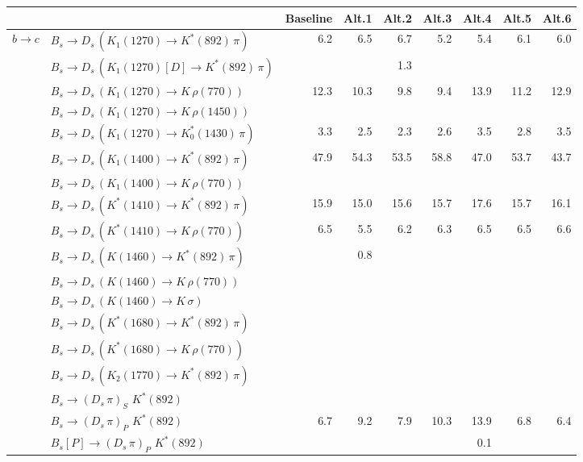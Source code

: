 \begin{tabular}{l l  r  r  r  r  r  r  r  } 
\toprule
& & \multicolumn{1}{c}{Baseline}  & \multicolumn{1}{c}{Alt.1}  & \multicolumn{1}{c}{Alt.2}  & \multicolumn{1}{c}{Alt.3}  & \multicolumn{1}{c}{Alt.4}  & \multicolumn{1}{c}{Alt.5}  & \multicolumn{1}{c}{Alt.6}  \\ 
\hline
\multirow{30}{*}{$b \to c$}  & $B_s \to D_s \, ( K_1(1270) \to K^{*}(892) \, \pi )$ & 6.2 & 6.5 & 6.7 & 5.2 & 5.4 & 6.1 & 6.0 \\ 
 & $B_s \to D_s \, ( K_1(1270)[D] \to K^{*}(892) \, \pi )$ &  &  & 1.3 &  &  &  &  \\ 
 & $B_s \to D_s \, ( K_1(1270) \to K \, \rho(770) )$ & 12.3 & 10.3 & 9.8 & 9.4 & 13.9 & 11.2 & 12.9 \\ 
 & $B_s \to D_s \, ( K_1(1270) \to K \, \rho(1450) )$ &  &  &  &  &  &  &  \\ 
 & $B_s \to D_s \, ( K_1(1270) \to K^{*}_{0}(1430) \, \pi )$ & 3.3 & 2.5 & 2.3 & 2.6 & 3.5 & 2.8 & 3.5 \\ 
 & $B_s \to D_s \, ( K_1(1400) \to K^{*}(892) \, \pi )$ & 47.9 & 54.3 & 53.5 & 58.8 & 47.0 & 53.7 & 43.7 \\ 
 & $B_s \to D_s \, ( K_1(1400) \to K \, \rho(770) )$ &  &  &  &  &  &  &  \\ 
 & $B_s \to D_s \, ( K^{*}(1410) \to K^{*}(892) \, \pi )$ & 15.9 & 15.0 & 15.6 & 15.7 & 17.6 & 15.7 & 16.1 \\ 
 & $B_s \to D_s \, ( K^{*}(1410) \to K \, \rho(770) )$ & 6.5 & 5.5 & 6.2 & 6.3 & 6.5 & 6.5 & 6.6 \\ 
 & $B_s \to D_s \, ( K(1460) \to K^{*}(892) \, \pi )$ &  & 0.8 &  &  &  &  &  \\ 
 & $B_s \to D_s \, ( K(1460) \to K \, \rho(770) )$ &  &  &  &  &  &  &  \\ 
 & $B_s \to D_s \, ( K(1460) \to K \, \sigma )$ &  &  &  &  &  &  &  \\ 
 & $B_s \to D_s \, ( K^{*}(1680) \to K^{*}(892) \, \pi )$ &  &  &  &  &  &  &  \\ 
 & $B_s \to D_s \, ( K^{*}(1680) \to K \, \rho(770) )$ &  &  &  &  &  &  &  \\ 
 & $B_s \to D_s \, ( K_2(1770) \to K^{*}(892) \, \pi )$ &  &  &  &  &  &  &  \\ 
 & $B_s \to ( D_s \, \pi)_{S} \, \, K^{*}(892)$ &  &  &  &  &  &  &  \\ 
 & $B_s \to ( D_s \, \pi)_{P} \, \, K^{*}(892)$ & 6.7 & 9.2 & 7.9 & 10.3 & 13.9 & 6.8 & 6.4 \\ 
 & $B_s[P] \to ( D_s \, \pi)_{P} \, \, K^{*}(892)$ &  &  &  &  & 0.1 &  &  \\ 

\end{tabular}
